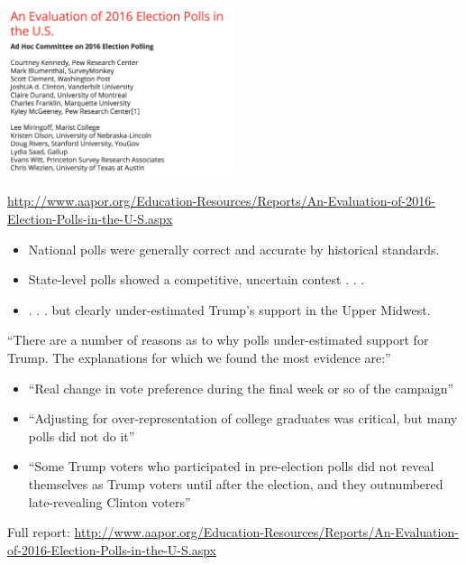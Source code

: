 \documentclass[aspectratio=169]{beamer}
\begin{document}
\begin{frame}

\begin{center}
\includegraphics[width=0.5\textwidth]{figures/aapor_2016_election_evaluation}
\end{center}

\vfill
\tiny{\url{http://www.aapor.org/Education-Resources/Reports/An-Evaluation-of-2016-Election-Polls-in-the-U-S.aspx}}

\end{frame}
\begin{frame}

\begin{itemize}
\item National polls were generally correct and accurate by historical standards.
\pause
\item State-level polls showed a competitive, uncertain contest  . . . 
\pause
\item  . . . but clearly under-estimated Trump's support in the Upper Midwest.
\end{itemize}

\end{frame}
\begin{frame}

``There are a number of reasons as to why polls under-estimated support for Trump. The explanations for which we found the most evidence are:''
\begin{itemize}
\item ``Real change in vote preference during the final week or so of the campaign''
\pause
\item ``Adjusting for over-representation of college graduates was critical, but many polls did not do it''
\pause
\item ``Some Trump voters who participated in pre-election polls did not reveal themselves as Trump voters until after the election, and they outnumbered late-revealing Clinton voters''
\end{itemize}

\vfill

Full report: \url{http://www.aapor.org/Education-Resources/Reports/An-Evaluation-of-2016-Election-Polls-in-the-U-S.aspx}

\end{frame}
\end{document}
